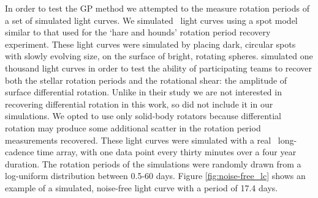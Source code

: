 In order to test the GP method we attempted to the measure rotation periods of
a set of simulated light curves.
We simulated \nlightcurves\ light curves using a spot model similar to that
used
for the \citet{Aigrain2015} `hare and hounds' rotation period recovery
experiment.
These light curves were simulated by placing dark, circular spots with slowly
evolving size, on the surface of bright, rotating spheres.
\citet{Aigrain2015} simulated one thousand light curves in order to test the
ability of participating teams to recover both the stellar rotation periods
and the rotational shear: the amplitude of surface differential rotation.
Unlike in their study we are not interested in recovering differential
rotation in this work, so did not include it in our simulations.
We opted to use only solid-body rotators because differential rotation may
produce some additional scatter in the rotation period measurements recovered.
These light curves were simulated with a real \Kepler\ long-cadence time
array, with one data point every thirty minutes over a four year duration.
The rotation periods of the simulations were randomly drawn from a log-uniform
distribution between 0.5-60 days.
Figure \ref{fig:noise-free_lc} shows an example of a simulated, noise-free
light curve with a period of 17.4 days.



